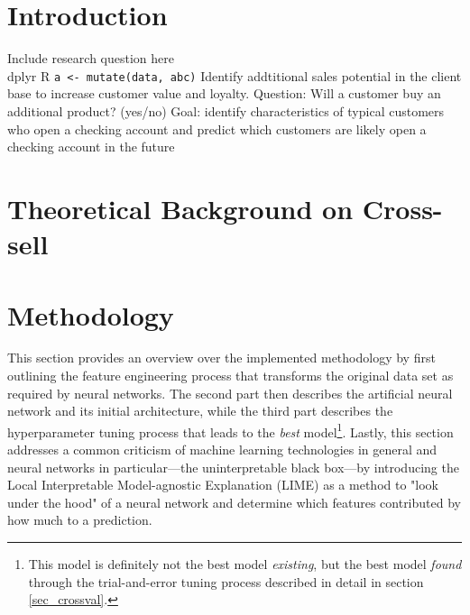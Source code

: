 \documentclass[12pt,a4paper]{article}
\newcommand{\pkg}[1]{{\normalfont\fontseries{b}\selectfont #1}}
\let\proglang=\textsf
\let\code=\texttt
\begin{document}
\pagebreak
\pagestyle{plain}
\tableofcontents
\pagebreak
\listoffigures
\listoftables
\newpage
\setcounter{page}{2}
\setlength{\baselineskip}{1.5\baselineskip}
\pagestyle{plain}


\section{Introduction}
\citep{hastieElementsStatisticalLearning2017}
Include research question here \\
\pkg{dplyr}
\proglang{R}
\code{a <- mutate(data, abc)}
Identify  addtitional  sales  potential in the client base to increase customer value and loyalty. \newline
Question: Will a customer buy an additional product? (yes/no) \newline
Goal: identify characteristics of typical customers who open a checking account and predict which customers
are likely open a checking account in the future
\section{Theoretical Background on Cross-sell}

\section{Methodology}
This section provides an overview over the implemented methodology by first outlining the feature engineering process that transforms the original data set
as required by neural networks.
The second part then describes the artificial neural network and its initial architecture, while the third part describes the hyperparameter tuning process
that leads to the \textit{best} model\footnote{This model is definitely not the best model \textit{existing}, but the best model \textit{found} through the trial-and-error tuning process described in detail in section \ref{sec_crossval}.}.
Lastly, this section addresses a common criticism of machine learning technologies in general and neural networks in particular---the 
uninterpretable black box---by introducing the Local Interpretable Model-agnostic Explanation (LIME) as a method to 
"look under the hood" of a neural network and determine which features contributed by how much to a prediction.
\end{document}
